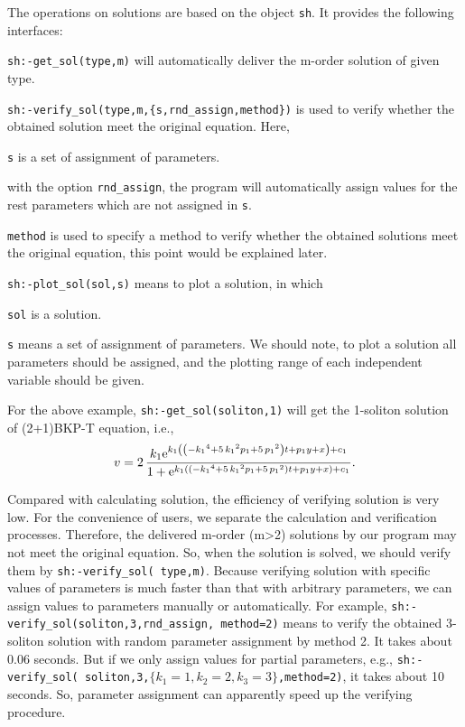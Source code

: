 The operations on solutions are based on the object \texttt{sh}.  It provides the following interfaces:
\begin{compactitem}[\textbullet]
\item \texttt{sh:-get\_sol(type,m)} will automatically deliver the m-order solution of given type. 
\item \verb|sh:-verify_sol(type,m,{s,rnd_assign,method})| is used to verify whether the obtained solution meet the original equation. Here,
\begin{compactitem}[- ]
\item \texttt{s} is a set of assignment of parameters.
\item with the option \texttt{rnd\_assign}, the program will automatically assign values for the rest parameters which are not assigned in \texttt{s}.
\item \texttt{method} is used to specify a method to verify whether the obtained solutions meet the original equation, this point would be explained later.
\end{compactitem}
\item \verb|sh:-plot_sol(sol,s)| means to plot a solution, in which
\begin{compactitem}[- ]
\item \texttt{sol} is a solution. 
\item \texttt{s} means a set of assignment of parameters. We should note, to plot a solution all parameters should be assigned, and the plotting range of each independent variable should be given.
\end{compactitem}
\end{compactitem}

For the above example, \texttt{sh:-get\_sol(soliton,1)} will get the 1-soliton solution of (2+1)BKP-T equation, i.e., 
\begin{equation}
v=2\,{\frac {k_{{1}}{{\rm e}^{k_{{1}} \left(  \left( -{k_{{1}}}^{4}+5\,{
k_{{1}}}^{2}p_{{1}}+5\,{p_{{1}}}^{2} \right) t+p_{{1}}y+x \right)+c_1 }}}{
1+{{\rm e}^{k_{{1}} \left(  \left( -{k_{{1}}}^{4}+5\,{k_{{1}}}^{2}p_{{
1}}+5\,{p_{{1}}}^{2} \right) t+p_{{1}}y+x \right)+c_1 }}}}.
\end{equation}

Compared with calculating solution, the efficiency of verifying solution is very low. For the convenience of users, we separate the calculation and verification processes. Therefore, the delivered m-order (m>2) solutions by our program may not meet the original equation. So, when the solution is solved, we should verify them by \texttt{sh:-verify\_sol( type,m)}. Because verifying solution with specific values of parameters is much faster than that with arbitrary parameters, we can assign values to parameters manually or automatically. For example, \texttt{sh:-verify\_sol(soliton,3,rnd\_assign, method=2)} means to verify the obtained 3-soliton solution with random parameter assignment by method 2. It takes about 0.06 seconds. But if we only assign values for partial parameters, e.g., \texttt{sh:-verify\_sol( soliton,3,$\{k_1=1,k_2=2,k_3=3\}$,method=2)}, it takes about 10 seconds. So, parameter assignment can apparently speed up the verifying procedure.

